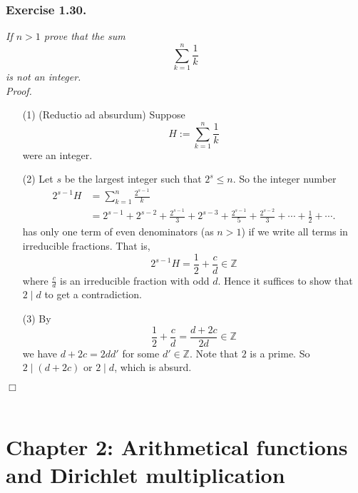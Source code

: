 \documentclass{article}
\begin{document}



\subsubsection*{Exercise 1.30.}
\emph{If $n > 1$ prove that the sum
\[
  \sum_{k=1}^{n} \frac{1}{k}
\]
is not an integer.} \\



\emph{Proof.}
\begin{enumerate}
\item[(1)]
  (Reductio ad absurdum)
  Suppose
  \[
    H := \sum_{k=1}^{n} \frac{1}{k}
  \]
  were an integer.

\item[(2)]
  Let $s$ be the largest integer such that $2^s \leq n$.
  So the integer number
  \begin{align*}
    2^{s-1} H
    &= \sum_{k=1}^{n} \frac{2^{s-1}}{k} \\
    &= 2^{s-1} + 2^{s-2} + \frac{2^{s-1}}{3} + 2^{s-3} + \frac{2^{s-1}}{5} + \frac{2^{s-2}}{3}
      + \cdots + \frac{1}{2} + \cdots.
  \end{align*}
  has only one term of even denominators (as $n > 1$)
  if we write all terms in irreducible fractions.
  That is,
  \[
  	2^{s-1} H = \frac{1}{2} + \frac{c}{d} \in \mathbb{Z}
  \]
  where $\frac{c}{d}$ is an irreducible fraction with odd $d$.
  Hence it suffices to show that $2 \mid d$ to get a contradiction.

\item[(3)]
  By
  \[
  	\frac{1}{2} + \frac{c}{d} = \frac{d + 2c}{2d} \in \mathbb{Z}
  \]
  we have $d + 2c = 2dd'$ for some $d' \in \mathbb{Z}$.
  Note that $2$ is a prime.
  So $2 \mid (d + 2c)$ or $2 \mid d$, which is absurd.
\end{enumerate}
$\Box$ \\\\






\newpage
\section*{Chapter 2: Arithmetical functions and Dirichlet multiplication \\}
\end{document}
